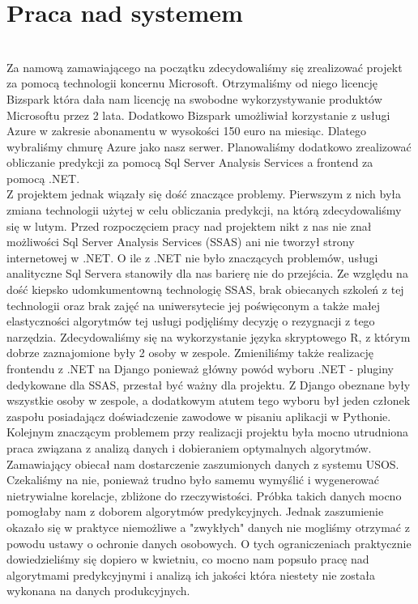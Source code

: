 \documentclass[licencjacka]{pracamgr}
\begin{document}
\section{Praca nad systemem} ~\\

Za namową zamawiającego na początku zdecydowaliśmy się zrealizować projekt za pomocą technologii koncernu Microsoft. Otrzymaliśmy od niego licencję Bizspark która dała nam licencję na swobodne wykorzystywanie produktów Microsoftu przez 2 lata. Dodatkowo Bizspark umożliwiał korzystanie z usługi Azure w zakresie abonamentu w wysokości 150 euro na miesiąc. Dlatego wybraliśmy chmurę Azure jako nasz serwer. Planowaliśmy dodatkowo zrealizować obliczanie predykcji za pomocą Sql Server Analysis Services a frontend za pomocą .NET. \\

Z projektem jednak wiązały się dość znaczące problemy. Pierwszym z nich była zmiana technologii użytej w celu obliczania predykcji, na którą zdecydowaliśmy się w lutym. Przed rozpoczęciem pracy nad projektem nikt z nas nie znał możliwości Sql Server Analysis Services (SSAS) ani nie tworzył strony internetowej w .NET. O ile z .NET nie było znaczących problemów, usługi analityczne Sql Servera stanowiły dla nas barierę nie do przejścia. Ze względu na dość kiepsko udomkumentowną technologię SSAS, brak obiecanych szkoleń z tej technologii oraz brak zajęć na uniwersytecie jej poświęconym a także małej elastyczności algorytmów tej usługi podjęliśmy decyzję o rezygnacji z tego narzędzia. Zdecydowaliśmy się na wykorzystanie języka skryptowego R, z którym dobrze zaznajomione były 2 osoby w zespole. Zmieniliśmy także realizację frontendu z .NET na Django ponieważ główny powód wyboru .NET - pluginy dedykowane dla SSAS, przestał być ważny dla projektu. Z Django obeznane były wszystkie osoby w zespole, a dodatkowym atutem tego wyboru był jeden członek zaspołu posiadającz doświadczenie zawodowe w pisaniu aplikacji w Pythonie. \\

Kolejnym znaczącym problemem przy realizacji projektu była mocno utrudniona praca związana z analizą danych i dobieraniem optymalnych algorytmów. Zamawiający obiecał nam dostarczenie zaszumionych danych z systemu USOS. Czekaliśmy na nie, ponieważ trudno było samemu wymyślić i wygenerować nietrywialne korelacje, zbliżone do rzeczywistości. Próbka takich danych mocno pomogłaby nam z doborem algorytmów predykcyjnych. Jednak zaszumienie okazało się w praktyce niemożliwe a "zwykłych" danych nie mogliśmy otrzymać z powodu ustawy o ochronie danych osobowych. O tych ograniczeniach praktycznie dowiedzieliśmy się dopiero w kwietniu, co mocno nam popsuło pracę nad algorytmami predykcyjnymi i analizą ich jakości która niestety nie została wykonana na danych produkcyjnych.
\end{document}
